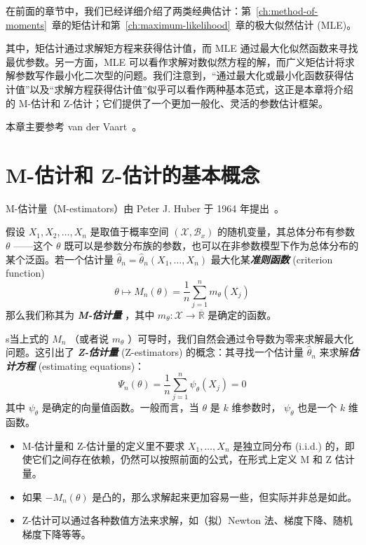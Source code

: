 在前面的章节中，我们已经详细介绍了两类经典估计：第~\ref{ch:method-of-moments}~章的矩估计和第~\ref{ch:maximum-likelihood}~章的极大似然估计 (MLE)。

其中，矩估计通过求解矩方程来获得估计值，而 MLE 通过最大化似然函数来寻找最优参数。另一方面，MLE 可以看作求解对数似然方程的解，而广义矩估计将求解参数写作最小化二次型的问题。我们注意到，“通过最大化或最小化函数获得估计值”以及“求解方程获得估计值”似乎可以看作两种基本范式，这正是本章将介绍的 M-估计和 Z-估计；它们提供了一个更加一般化、灵活的参数估计框架。

本章主要参考 van der Vaart~\cite[第 5、19 章]{vandervaart1998}。

\section{M-估计和 Z-估计的基本概念}

M-估计量（M-estimators）由 Peter J. Huber 于 1964 年提出~\cite{huber1964}。

\begin{definition*}
假设 $X_1,X_2,\dots,X_n$ 是取值于概率空间 $(\mathscr X,\mathscr B_x)$ 的随机变量，其总体分布有参数 $\theta$ ------这个 $\theta$ 既可以是参数分布族的参数，也可以在非参数模型下作为总体分布的某个泛函。若一个估计量 $\widehat\theta_n=\widehat\theta_n(X_1,\dots,X_n)$ 最大化某\textbf{\emph{准则函数}} (criterion function) 
$$\theta \mapsto M_n(\theta)=\frac1n\sum_{j=1}^nm_\theta(X_j)$$
那么我们称其为 \textbf{\emph{M-估计量}} ，其中 $m_\theta:\mathscr X\to \overline{\mathbb R}$ 是确定的函数。

s当上式的 $M_n$ （或者说 $m_\theta$ ）可导时，我们自然会通过令导数为零来求解最大化问题。这引出了 \textbf{\emph{Z-估计量}} (Z-estimators) 的概念：其寻找一个估计量 $\widehat{\theta}_n$ 来求解\textbf{\emph{估计方程}} (estimating equations)：
\[\Psi_n(\theta)=\frac1n\sum_{j=1}^n\psi_\theta(X_j)=0\]
其中 $\psi_\theta$ 是确定的向量值函数。一般而言，当 $\theta$ 是 $k$ 维参数时， $\psi_\theta$ 也是一个 $k$ 维函数。
\end{definition*}

\begin{remark}

\begin{itemize}
\tightlist
\item
  M-估计量和 Z-估计量的定义里不要求 $X_1,\dots,X_n$ 是独立同分布 (i.i.d.) 的，即使它们之间存在依赖，仍然可以按照前面的公式，在形式上定义 M 和 Z 估计量。
\item
  如果 $-M_n(\theta)$ 是凸的，那么求解起来更加容易一些，但实际并非总是如此。
\item
  Z-估计可以通过各种数值方法来求解，如（拟）Newton 法、梯度下降、随机梯度下降等等。
\end{itemize}
\end{remark}

